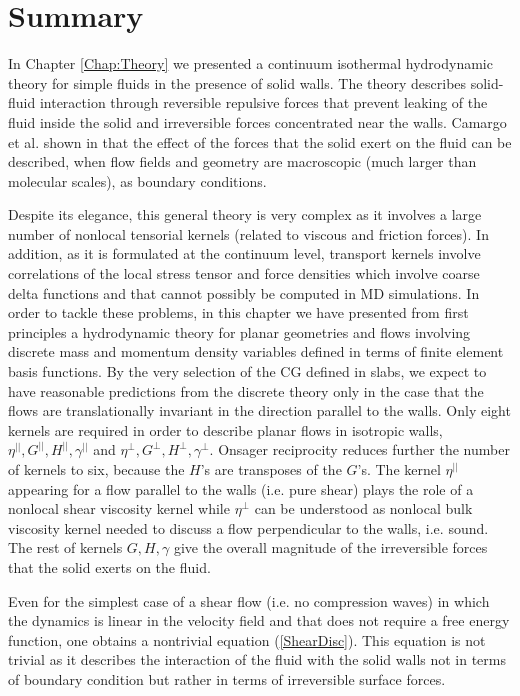 \documentclass[b5paper,openright,10pt]{book}
\begin{document}
\section{Summary}
In Chapter \ref{Chap:Theory} we presented  a continuum isothermal
hydrodynamic  theory  for  simple  fluids in  the  presence  of  solid
walls. The theory describes solid-fluid interaction through reversible
repulsive forces  that prevent leaking  of the fluid inside  the solid
and irreversible forces concentrated near  the walls. Camargo et al. shown in
\cite{CamargoBC2018} that  the effect of  the forces that  the solid exert  on the
fluid can be described, when  flow fields and geometry are macroscopic
(much larger than molecular scales), as boundary conditions.

Despite  its elegance,  this  general  theory is  very  complex as  it
involves a  large number  of nonlocal  tensorial kernels  (related to
viscous and friction forces).  In addition, as it is formulated at the
continuum level,  transport kernels involve correlations  of the local
stress tensor and force densities  which involve coarse delta functions
and that cannot  possibly be computed in MD simulations.   In order to
tackle these problems,  in this chapter we  have presented from
first principles a hydrodynamic theory for planar geometries and flows
involving  discrete mass  and  momentum density  variables defined  in
terms of finite element basis functions.  By the very selection of the
CG defined in slabs, we expect to have reasonable predictions from the
discrete theory  only in the  case that the flows  are translationally
invariant in the direction parallel  to the walls.  Only eight kernels
are required  in order  to describe planar  flows in  isotropic walls,
$\eta^{||},G^{||},H^{||},\gamma^{||}$                              and
$\eta^{\bot},G^{\bot},H^{\bot},\gamma^{\bot}$.    Onsager  reciprocity
reduces further  the number of kernels  to six, because the  $H$'s are
transposes of the $G$'s.  The  kernel $\eta^{||}$ appearing for a flow
parallel to the walls (i.e. pure  shear) plays the role of a nonlocal
shear  viscosity  kernel  while  $\eta^{\bot}$ can  be  understood  as
nonlocal bulk viscosity kernel needed to discuss a flow perpendicular
to the walls,  i.e. sound.  The rest of kernels  $G,H,\gamma$ give the
overall magnitude of the irreversible  forces that the solid exerts on
the fluid.

Even for the simplest case of a shear flow (i.e. no compression waves)
in which  the dynamics is linear  in the velocity field  and that does
not require a free energy function, one obtains a nontrivial equation
(\ref{ShearDisc}). This  equation is not  trivial as it  describes the
interaction of the fluid with the solid walls not in terms of boundary
condition but rather in terms of irreversible surface forces.
\end{document}
